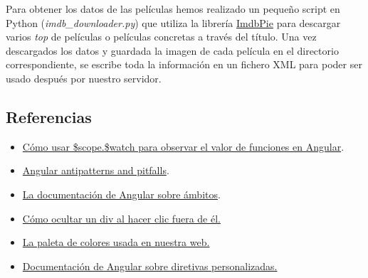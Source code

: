 \documentclass{apuntes}
\begin{document}
Para obtener los datos de las películas hemos realizado un pequeño script en Python (\textit{imdb\_downloader.py}) que utiliza la librería \href{https://github.com/richardasaurus/imdb-pie}{ImdbPie} para descargar varios \textit{top} de películas o películas concretas a través del título. Una vez descargados los datos y guardada la imagen de cada película en el directorio correspondiente, se escribe toda la información en un fichero XML para poder ser usado después por nuestro servidor.

\subsection{Referencias}

\begin{itemize}
	\item \href{http://www.bennadel.com/blog/2658-using-scope-watch-to-watch-functions-in-angularjs.htm}{Cómo usar \$scope.\$watch para observar el valor de funciones en Angular}.
	\item \href{http://nathanleclaire.com/blog/2014/04/19/5-angularjs-antipatterns-and-pitfalls/}{Angular antipatterns and pitfalls}.
	\item \href{https://github.com/angular/angular.js/wiki/Understanding-Scopes}{La documentación de Angular sobre ámbitos}.
	\item \href{http://stackoverflow.com/questions/17706847/not-sure-how-to-hide-a-div-when-clicking-outside-of-the-div}{Cómo ocultar un div al hacer clic fuera de él.}
	\item \href{http://www.colorcombos.com/color-schemes/22/ColorCombo22.html}{La paleta de colores usada en nuestra web.}
	\item \href{https://docs.angularjs.org/guide/directive}{Documentación de Angular sobre diretivas personalizadas.}
\end{itemize}
\end{document}
